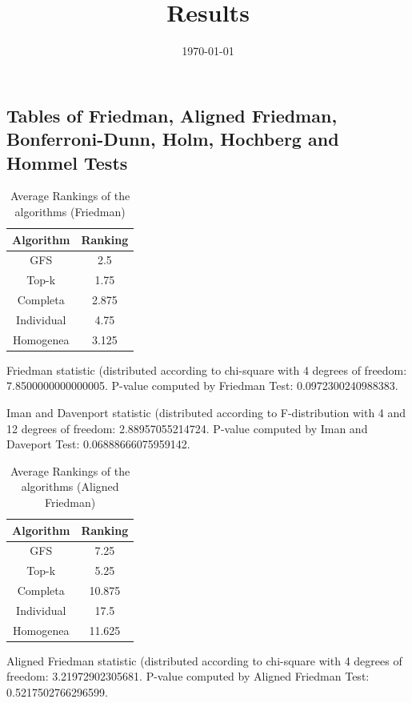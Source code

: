 \documentclass[a4paper,10pt]{article}
\title{Results}
\author{}
\date{\today}
\begin{document}
\begin{landscape}
\oddsidemargin 0in \topmargin 0in\maketitle
\section{Tables of Friedman, Aligned Friedman, Bonferroni-Dunn, Holm, Hochberg and Hommel Tests}
\begin{table}[!htp]
\centering
\caption{Average Rankings of the algorithms (Friedman)
}\begin{tabular}{c|c}
Algorithm&Ranking\\
\hline
GFS&2.5\\
Top-k&1.75\\
Completa&2.875\\
Individual&4.75\\
Homogenea&3.125\\
\end{tabular}
\end{table}


Friedman statistic (distributed according to chi-square with 4 degrees of freedom: 7.8500000000000005. 
P-value computed by Friedman Test: 0.0972300240988383.\newline

Iman and Davenport statistic (distributed according to F-distribution with 4 and 12 degrees of freedom: 2.88957055214724. 
P-value computed by Iman and Daveport Test: 0.06888666075959142.\newline


\newpage

\begin{table}[!htp]
\centering
\caption{Average Rankings of the algorithms (Aligned Friedman)
}\begin{tabular}{c|c}
Algorithm&Ranking\\
\hline
GFS&7.25\\
Top-k&5.25\\
Completa&10.875\\
Individual&17.5\\
Homogenea&11.625\\
\end{tabular}
\end{table}


Aligned Friedman statistic (distributed according to chi-square with 4 degrees of freedom: 3.21972902305681. 
P-value computed by Aligned Friedman Test: 0.5217502766296599.\newline



\end{landscape}
\end{document}
